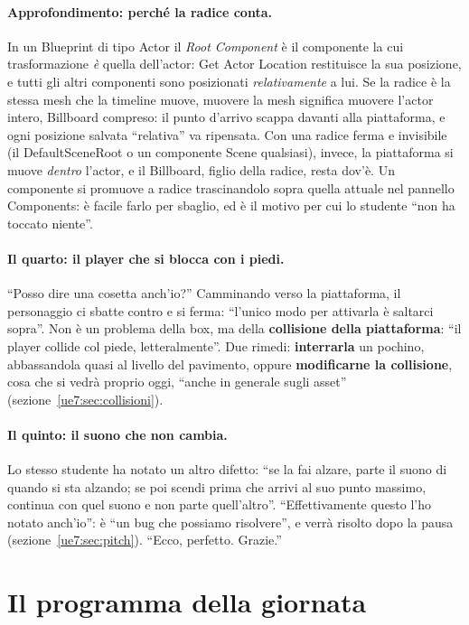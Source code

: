 \paragraph{Approfondimento: perché la radice conta.} In un Blueprint di tipo Actor il
\emph{Root Component} è il componente la cui trasformazione \emph{è} quella dell'actor:
Get Actor Location restituisce la sua posizione, e tutti gli altri componenti sono
posizionati \emph{relativamente} a lui. Se la radice è la stessa mesh che la timeline
muove, muovere la mesh significa muovere l'actor intero, Billboard compreso: il punto
d'arrivo scappa davanti alla piattaforma, e ogni posizione salvata ``relativa'' va
ripensata. Con una radice ferma e invisibile (il DefaultSceneRoot o un componente Scene
qualsiasi), invece, la piattaforma si muove \emph{dentro} l'actor, e il Billboard, figlio
della radice, resta dov'è. Un componente si promuove a radice trascinandolo sopra quella
attuale nel pannello Components: è facile farlo per sbaglio, ed è il motivo per cui lo
studente ``non ha toccato niente''.

\paragraph{Il quarto: il player che si blocca con i piedi.} ``Posso dire una cosetta
anch'io?'' Camminando verso la piattaforma, il personaggio ci sbatte contro e si ferma:
``l'unico modo per attivarla è saltarci sopra''. Non è un problema della box, ma della
\textbf{collisione della piattaforma}: ``il player collide col piede, letteralmente''.
Due rimedi: \textbf{interrarla} un pochino, abbassandola quasi al livello del pavimento,
oppure \textbf{modificarne la collisione}, cosa che si vedrà proprio oggi, ``anche in
generale sugli asset'' (sezione~\ref{ue7:sec:collisioni}).

\paragraph{Il quinto: il suono che non cambia.} Lo stesso studente ha notato un altro
difetto: ``se la fai alzare, parte il suono di quando si sta alzando; se poi scendi
prima che arrivi al suo punto massimo, continua con quel suono e non parte quell'altro''.
``Effettivamente questo l'ho notato anch'io'': è ``un bug che possiamo risolvere'', e
verrà risolto dopo la pausa (sezione~\ref{ue7:sec:pitch}). ``Ecco, perfetto. Grazie.''

\section{Il programma della giornata}
\label{ue7:sec:programma}

